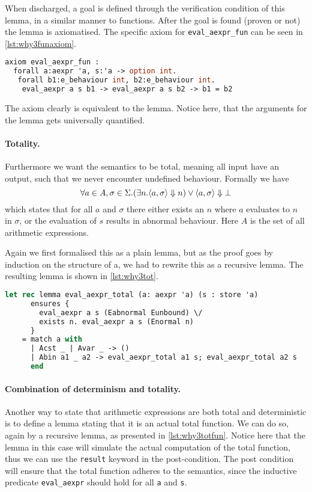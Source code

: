 When discharged, a goal is defined through the verification condition of this lemma, in a similar manner to functions.
After the goal is found (proven or not) the lemma is axiomatised. The specific axiom for \texttt{eval_aexpr_fun} can be seen in \autoref{lst:why3funaxiom}.

\begin{lstlisting}[caption={Axiom of functional lemma},label={lst:why3funaxiom},language=sml]
axiom eval_aexpr_fun :
  forall a:aexpr 'a, s:'a -> option int.
   forall b1:e_behaviour int, b2:e_behaviour int.
    eval_aexpr a s b1 -> eval_aexpr a s b2 -> b1 = b2
\end{lstlisting}

The axiom clearly is equivalent to the lemma. Notice here, that the arguments for the lemma gets universally quantified.

\paragraph{Totality.}
Furthermore we want the semantics to be total, meaning all input have an output, such that we never encounter undefined behaviour.
Formally we have
\[
\forall a \in A, \sigma \in \Sigma. (\exists n. \langle a, \sigma \rangle \Downarrow n) \vee \langle a, \sigma \rangle \Downarrow \bot
\]
which states that for all $a$ and $\sigma$ there either exists an $n$ where $a$ evaluates to $n$ in $\sigma$, or the evaluation of $s$ results in abnormal behaviour. Here $A$ is the set of all arithmetic expressions.

Again we first formalised this as a plain lemma, but as the proof goes by induction on the structure of a,
we had to rewrite this as a recursive lemma. The resulting lemma is shown in \autoref{lst:why3tot}.

\begin{lstlisting}[caption={Axiom of functional lemma},label={lst:why3tot},language=sml]
  let rec lemma eval_aexpr_total (a: aexpr 'a) (s : store 'a)
      ensures {
        eval_aexpr a s (Eabnormal Eunbound) \/
        exists n. eval_aexpr a s (Enormal n)
      }
    = match a with
      | Acst _ | Avar _ -> ()
      | Abin a1 _ a2 -> eval_aexpr_total a1 s; eval_aexpr_total a2 s
      end
\end{lstlisting}

\paragraph{Combination of determinism and totality.}
Another way to state that arithmetic expressions are both total and deterministic is to define a lemma stating that it is an actual total function.
We can do so, again by a recursive lemma, as presented in \autoref{lst:why3totfun}. Notice here that the lemma in this case will simulate the actual
computation of the total function, thus we can use the \texttt{result} keyword in the post-condition.
The post condition will ensure that the total function adheres to the semantics, since the inductive predicate
\texttt{eval_aexpr} should hold for all \texttt{a} and \texttt{s}.

